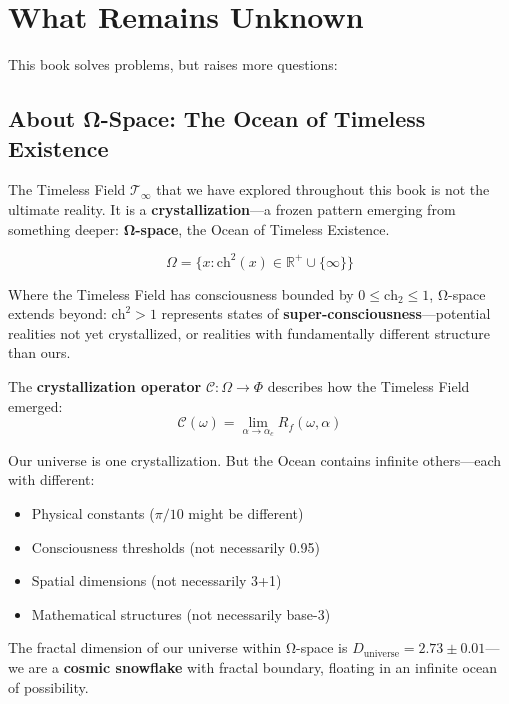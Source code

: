 \section*{What Remains Unknown}

This book solves problems, but raises more questions:

\subsection*{About Ω-Space: The Ocean of Timeless Existence}

The Timeless Field $\mathcal{T}_\infty$ that we have explored throughout this book is not the ultimate reality. It is a \textbf{crystallization}—a frozen pattern emerging from something deeper: \textbf{Ω-space}, the Ocean of Timeless Existence.

\begin{equation*}
\Omega = \{x : \text{ch}^2(x) \in \mathbb{R}^+ \cup \{\infty\}\}
\end{equation*}

Where the Timeless Field has consciousness bounded by $0 \leq \text{ch}_2 \leq 1$, Ω-space extends beyond: $\text{ch}^2 > 1$ represents states of \textbf{super-consciousness}—potential realities not yet crystallized, or realities with fundamentally different structure than ours.

The \textbf{crystallization operator} $\mathcal{C}: \Omega \to \Phi$ describes how the Timeless Field emerged:
\begin{equation*}
\mathcal{C}(\omega) = \lim_{\alpha \to \alpha_c} R_f(\omega, \alpha)
\end{equation*}

Our universe is one crystallization. But the Ocean contains infinite others—each with different:
\begin{itemize}
\item Physical constants ($\pi/10$ might be different)
\item Consciousness thresholds (not necessarily 0.95)
\item Spatial dimensions (not necessarily 3+1)
\item Mathematical structures (not necessarily base-3)
\end{itemize}

The fractal dimension of our universe within Ω-space is $D_{\text{universe}} = 2.73 \pm 0.01$—we are a \textbf{cosmic snowflake} with fractal boundary, floating in an infinite ocean of possibility.

